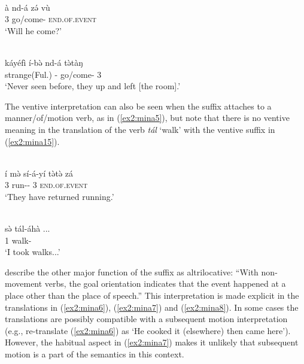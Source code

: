 \ex\label{ex2:mina4}
 \\
\gll  à	nd-á	zə́	vù \\
3	go/come-	\textsc{end.of.event}	 \\
\glt `Will he come?'

\ex\label{ex2:mina14}
 \\
\gll káyéfì í-bə̀ nd-á tə̀tàŋ	\\
strange(Ful.) - go/come- 3	\\
\glt `Never seen before, they up and left [the room].'
\z

The ventive interpretation can also be seen when the suffix attaches to a manner{\slash}of{\slash}motion verb, as in (\ref{ex2:mina5}), but note that there is no ventive meaning in the translation of the verb \textit{tál} `walk' with the ventive suffix in (\ref{ex2:mina15}).

\ea\label{ex2:mina5}
 \\
\gll  í	mə̀	 sí-á-yí	tə̀tə̀	zá \\
3		run--	3	\textsc{end.of.event} \\
\glt `They have returned running.'

\ex\label{ex2:mina15}
 \\
\gll  sə̀	tál-áhà	... \\
1	walk-	 \\
\glt `I took walks...'
\z

\citet[176]{frajzyngierGrammarMina2005} describe the other major function of the suffix as altrilocative: ``With non-movement verbs, the goal orientation indicates that the event happened at a place other than the place of speech.'' This interpretation is made explicit in the translations in (\ref{ex2:mina6}), (\ref{ex2:mina7}) and (\ref{ex2:mina8}). In some cases the translations are possibly compatible with a subsequent motion interpretation (e.g., re-translate (\ref{ex2:mina6})  as ‘He cooked it (elsewhere) then came here'). However, the habitual aspect in (\ref{ex2:mina7}) makes it unlikely that subsequent motion is a part of the semantics in this context. 

